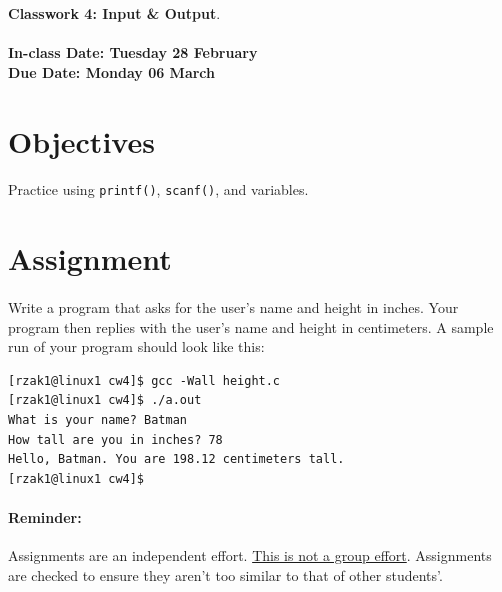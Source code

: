\documentclass[letter,11pt]{article}
\begin{document}
\huge
\textbf{Classwork 4: Input \& Output}.
\normalsize
\\ ~~ \\
\textbf{In-class Date: Tuesday 28 February} \\
\textbf{Due Date: Monday 06 March}

\section*{Objectives}
\paragraph{}Practice using \texttt{printf()}, \texttt{scanf()}, and variables.

\section*{Assignment}
\paragraph{}Write a program that asks for the user's name and height in inches. Your program then replies with the user's name and height in centimeters. A sample run of your program should look like this:
\begin{verbatim}
[rzak1@linux1 cw4]$ gcc -Wall height.c 
[rzak1@linux1 cw4]$ ./a.out
What is your name? Batman
How tall are you in inches? 78
Hello, Batman. You are 198.12 centimeters tall.
[rzak1@linux1 cw4]$ 
\end{verbatim}

\paragraph{Reminder:} Assignments are an independent effort. \underline{This is not a group effort}. Assignments are checked to ensure they aren't too similar to that of other students'.
\end{document}
